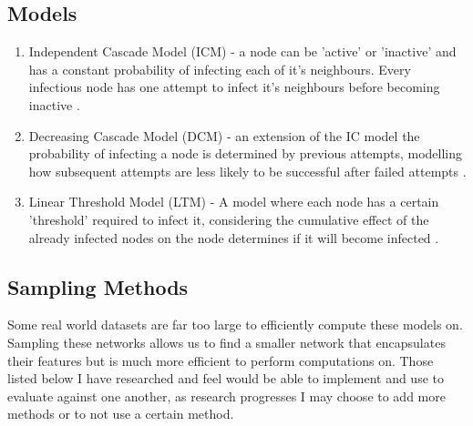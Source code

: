 \documentclass{article}
\begin{document}
\subsection{Models} \label{probDiscModels}
\begin{enumerate}
	\item Independent Cascade Model (ICM) - a node can be 'active' or 'inactive' and has a constant probability of infecting each of it's neighbours.
	      Every infectious node has one attempt to infect it's neighbours before becoming inactive \cite{kempe2005influential}.
	\item Decreasing Cascade Model (DCM) - an extension of the IC model the probability of infecting a node is determined by previous attempts, modelling how subsequent attempts are less likely to be successful after failed attempts \cite{kempe2006influential}.
	\item Linear Threshold Model (LTM) - A model where each node has a certain 'threshold' required to infect it, considering the cumulative effect of the already infected nodes on the node determines if it will become infected \cite{kempe2005influential}.
\end{enumerate}

\subsection{Sampling Methods} \label{probDiscSampling}

Some real world datasets are far too large to efficiently compute these models on.
Sampling these networks allows us to find a smaller network that encapsulates their features but is much more efficient to perform computations on.
Those listed below I have researched and feel would be able to implement and use to evaluate against one another, as research progresses I may choose to add more methods or to not use a certain method.
\end{document}
